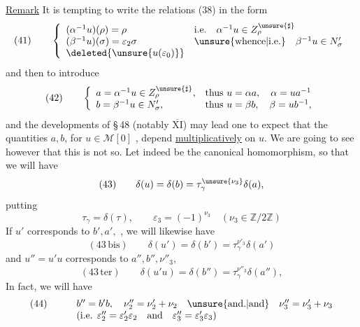 
\uline{Remark} It is tempting to write the 
relations (38) in the form
\[
(41)\qquad
\left\{\begin{array}{ll}
(\alpha^{-1}u)(\rho)=\rho
  & \text{i.e.}\quad \alpha^{-1}u\in Z_\rho^{\unsure{\sharp}}\\
(\beta^{-1}u)(\sigma)=\varepsilon_2\sigma
  & \unsure{\text{whence}|\text{i.e.}}\quad \beta^{-1}u\in N'_\sigma\\
\deleted{\unsure{u(\varepsilon_0)}} &
\end{array}\right.
\]
and then to introduce
\[
(42)\qquad
\left\{\begin{array}{ll}
a=\alpha^{-1}u\in Z_\rho^{\unsure{\sharp}},
  & \text{thus }u=\alpha a,\quad \alpha=ua^{-1}\\
b=\beta^{-1}u\in N'_\sigma,
  & \text{thus }u=\beta b,\quad \beta=ub^{-1},
\end{array}\right.
\]
and the developments of \S\,48 (notably
\uline{\(\overline{\mathrm{XI}}\)}) may lead one to expect that the
quantities \(a,b\), for \(u\in\mathcal{M}[0]\) ,
depend \uline{multiplicatively} on \(u\). We are going to see however
that this is not so. Let indeed
be the canonical homomorphism, so that we will have
\[
(43)\qquad
\delta(u)=\delta(b)=\tau_\gamma^{\unsure{\nu_3}}\delta(a),
\]
putting
\[
\tau_\gamma=\delta(\tau),\qquad
\varepsilon_3=(-1)^{\nu_3}\quad
(\nu_3\in\mathbb Z/2\mathbb Z)
\]
If \(u'\) corresponds to \(b',a',\) , we will
likewise have
\[
(43\,\mathrm{bis})\qquad
\delta(u')=\delta(b')=\tau_\gamma^{\nu'_3}\delta(a')
\]
and  \(u''=u'u\) corresponds to \(a'',b'',\nu''_3\),
\[
(43\,\mathrm{ter})\qquad
\delta(u'u)=\delta(b'')=\tau_\gamma^{\nu''_3}\delta(a''),
\]
In fact, we will have
\[
\begin{array}{rl}
(44)\qquad & b''=b'b,\quad \nu''_2=\nu'_2+\nu_2\quad
 \unsure{\text{and.}|\text{and}}\quad \nu''_3=\nu'_3+\nu_3\\
& (\text{i.e. }\varepsilon''_2=\varepsilon'_2\varepsilon_2
\quad\text{and}\quad\varepsilon''_3=\varepsilon'_3\varepsilon_3)
\end{array}
\]

